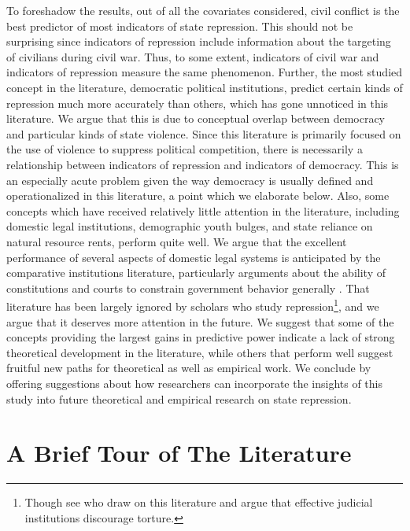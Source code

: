 \documentclass[12pt]{article}
\begin{document}
To foreshadow the results, out of all the covariates considered, civil conflict is the best predictor of most indicators of state repression. This should not be surprising since indicators of repression include information about the targeting of civilians during civil war. Thus, to some extent, indicators of civil war and indicators of repression measure the same phenomenon. Further, the most studied concept in the literature, democratic political institutions, predict certain kinds of repression much more accurately than others, which has gone unnoticed in this literature. We argue that this is due to conceptual overlap between democracy and particular kinds of state violence. Since this literature is primarily focused on the use of violence to suppress political competition, there is necessarily a relationship between indicators of repression and indicators of democracy. This is an especially acute problem given the way democracy is usually defined and operationalized in this literature, a point which we elaborate below. Also, some concepts which have received relatively little attention in the literature, including domestic legal institutions, demographic youth bulges, and state reliance on natural resource rents, perform quite well. We argue that the excellent performance of several aspects of domestic legal systems is anticipated by the comparative institutions literature, particularly arguments about the ability of constitutions and courts to constrain government behavior generally \citep[E.g.,][]{NorthWeingast1989, Ordeshook1992, Weingast1997, Carey2000, Vanberg2005, ElkinsGinsburgMelton2009}. That literature has been largely ignored by scholars who study repression\footnote{Though see \citet{PowellStaton2009} who draw on this literature and argue that effective judicial institutions discourage torture.}, and we argue that it deserves more attention in the future. We suggest that some of the concepts providing the largest gains in predictive power indicate a lack of strong theoretical development in the literature, while others that perform well suggest fruitful new paths for theoretical as well as empirical work. We conclude by offering suggestions about how researchers can incorporate the insights of this study into future theoretical and empirical research on state repression. 

\section{A Brief Tour of The Literature}
\end{document}
